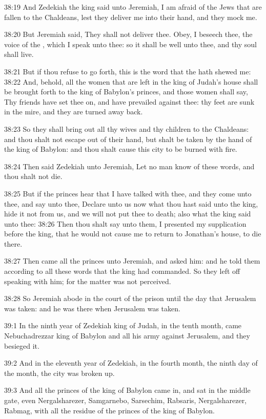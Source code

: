 38:19 And Zedekiah the king said unto Jeremiah, I am afraid of the Jews that are fallen to the Chaldeans, lest they deliver me into their hand, and they mock me.

38:20 But Jeremiah said, They shall not deliver thee. Obey, I beseech thee, the voice of the \LORD, which I speak unto thee: so it shall be well unto thee, and thy soul shall live.

38:21 But if thou refuse to go forth, this is the word that the \LORD hath shewed me: 38:22 And, behold, all the women that are left in the king of Judah's house shall be brought forth to the king of Babylon's princes, and those women shall say, Thy friends have set thee on, and have prevailed against thee: thy feet are sunk in the mire, and they are turned away back.

38:23 So they shall bring out all thy wives and thy children to the Chaldeans: and thou shalt not escape out of their hand, but shalt be taken by the hand of the king of Babylon: and thou shalt cause this city to be burned with fire.

38:24 Then said Zedekiah unto Jeremiah, Let no man know of these words, and thou shalt not die.

38:25 But if the princes hear that I have talked with thee, and they come unto thee, and say unto thee, Declare unto us now what thou hast said unto the king, hide it not from us, and we will not put thee to death; also what the king said unto thee: 38:26 Then thou shalt say unto them, I presented my supplication before the king, that he would not cause me to return to Jonathan's house, to die there.

38:27 Then came all the princes unto Jeremiah, and asked him: and he told them according to all these words that the king had commanded. So they left off speaking with him; for the matter was not perceived.

38:28 So Jeremiah abode in the court of the prison until the day that Jerusalem was taken: and he was there when Jerusalem was taken.

39:1 In the ninth year of Zedekiah king of Judah, in the tenth month, came Nebuchadrezzar king of Babylon and all his army against Jerusalem, and they besieged it.

39:2 And in the eleventh year of Zedekiah, in the fourth month, the ninth day of the month, the city was broken up.

39:3 And all the princes of the king of Babylon came in, and sat in the middle gate, even Nergalsharezer, Samgarnebo, Sarsechim, Rabsaris, Nergalsharezer, Rabmag, with all the residue of the princes of the king of Babylon.

